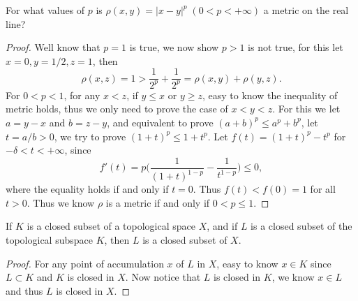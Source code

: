 \begin{pro}%
	For what values of $p$ is $\rho(x,y)=|x-y|^p\;(0<p<+\infty)$ a metric on the real line?
\end{pro}
\begin{proof}
	Well know that $p=1$ is true, we now show $p>1$ is not true, for this let $x=0,y=1/2,z=1$, then 
	\[\rho(x,z)=1>\frac{1}{2^p}+\frac{1}{2^p}=\rho(x,y)+\rho(y,z).\]
	For $0<p<1$, for any $x<z$, if $y\leq x$ or $y\geq z$, easy to know the inequality of metric holds, thus we only need to prove the case of $x<y<z$. For this we let $a=y-x$ and $b=z-y$, and equivalent to prove $(a+b)^p\leq a^p+b^p$, let $t=a/b>0$, we try to prove $(1+t)^p\leq 1+t^p$. Let $f(t)=(1+t)^p-t^p$ for $-\delta<t<+\infty$, since
	\[f'(t)=p\bigg(\frac{1}{(1+t)^{1-p}}-\frac{1}{t^{1-p}}\bigg)\leq 0,\]
	where the equality holds if and only if $t=0$. Thus $f(t)<f(0)=1$ for all $t>0$. Thus we know $\rho$ is a metric if and only if $0<p\leq 1$.
\end{proof}

\begin{pro}%
	If $K$ is a closed subset of a topological space $X$, and if $L$ is a closed subset of the topological subspace $K$, then $L$ is a closed subset of $X$.
\end{pro}
\begin{proof}
	For any point of accumulation $x$ of $L$ in $X$, easy to know $x\in K$ since $L\subset K$ and $K$ is closed in $X$. Now notice that $L$ is closed in $K$, we know $x\in L$ and thus $L$ is closed in $X$.
\end{proof}

